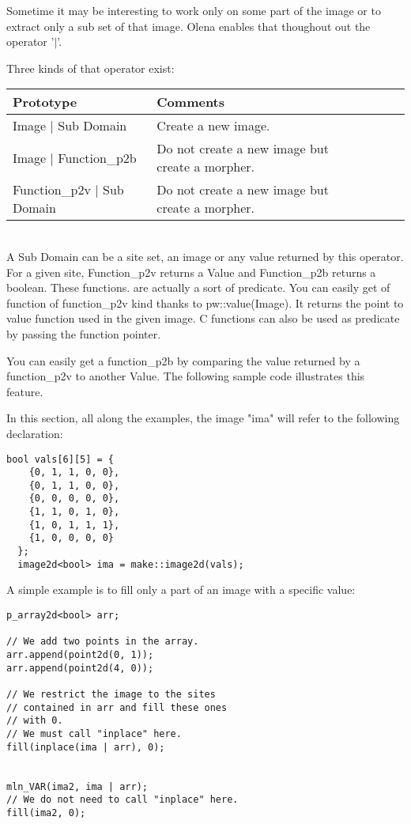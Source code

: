 \documentclass{report}
\begin{document}
Sometime it may be interesting to work only on some part of the image or to
extract only a sub set of that image. Olena enables that thoughout out the
operator '$|$'.

Three kinds of that operator exist:\\

\begin{tabular}{|l|l|l|l|p{4cm}|}
\hline
Prototype & Comments \\ \hline

Image $|$ Sub Domain & Create a new image.\\ \hline
Image $|$ Function\_p2b & Do not create a new image but create a morpher.\\
\hline
Function\_p2v $|$ Sub Domain & Do not create a new image but create a morpher.\\
\hline
\end{tabular} \\

A Sub Domain can be a site set, an image or any value returned by this
operator.
For a given site, Function\_p2v returns a Value and Function\_p2b returns a
boolean. These functions. are actually a sort of predicate. You can easily get
of function of function\_p2v kind thanks to pw::value(Image). It returns the
point to value function used in the given image. C functions can also be used as
predicate by passing the function pointer.

You can easily get a function\_p2b by comparing the value returned 
by a function\_p2v to another Value.
The following sample code illustrates this feature.

In this section, all along the examples, the image "ima" will refer to the
following declaration:
\begin{lstlisting}[frame=single]
  bool vals[6][5] = {
    {0, 1, 1, 0, 0},
    {0, 1, 1, 0, 0},
    {0, 0, 0, 0, 0},
    {1, 1, 0, 1, 0},
    {1, 0, 1, 1, 1},
    {1, 0, 0, 0, 0}
  };
  image2d<bool> ima = make::image2d(vals);
\end{lstlisting}

A simple example is to fill only a part of an image with a specific value:
\begin{lstlisting}[frame=single]
p_array2d<bool> arr;

// We add two points in the array.
arr.append(point2d(0, 1));
arr.append(point2d(4, 0));

// We restrict the image to the sites
// contained in arr and fill these ones
// with 0.
// We must call "inplace" here.
fill(inplace(ima | arr), 0);


mln_VAR(ima2, ima | arr);
// We do not need to call "inplace" here.
fill(ima2, 0);
\end{lstlisting}
\end{document}
